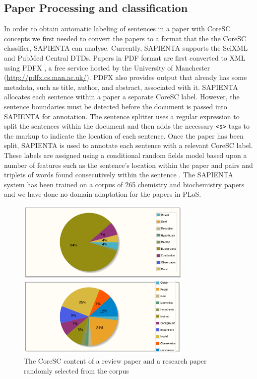 \documentclass{svmult}
\begin{document}
\subsection*{Paper Processing and classification}
In order to obtain automatic labeling of sentences in a paper with
CoreSC concepts we first needed to convert the papers to a format that
the the CoreSC classifier, SAPIENTA can analyse.  Currently, SAPIENTA
supports the SciXML and PubMed Central DTDs.  Papers in PDF format are
first converted to XML using PDFX %
, a free service hosted
by the University of Manchester (\url{http://pdfx.cs.man.ac.uk/}).
PDFX also provides output that already has some metadata, such as
title, author, and abstract, associated with it.  SAPIENTA allocates
each sentence within a paper a separate CoreSC label.  However, the
sentence boundaries must be detected before the document is passed
into SAPIENTA for annotation.  The sentence splitter uses a regular
expression to split the sentences within the document and then adds
the necessary \verb|<s>| tags to the markup to indicate the location
of each sentence.  Once the paper has been split, SAPIENTA is used to
annotate each sentence with a relevant CoreSC label.  These labels are
assigned using a conditional random fields model based upon a number
of features such as the sentence's location within the paper and pairs
and triplets of words found consecutively within the sentence
\cite{Liakata2012}.  The SAPIENTA system has been trained on a corpus
of 265 chemistry and biochemistry papers and we have done no domain
adaptation for the papers in PLoS.



\begin{figure}[t]

\centering

\includegraphics[width=0.75\textwidth]{figures/review_corescs.png}

\includegraphics[width=0.75\textwidth]{figures/report_corescs.png}

\caption{The CoreSC content of a review paper and a research paper randomly selected from the corpus}

\label{fig:coresc_pies} 
\end{figure}
\end{document}

